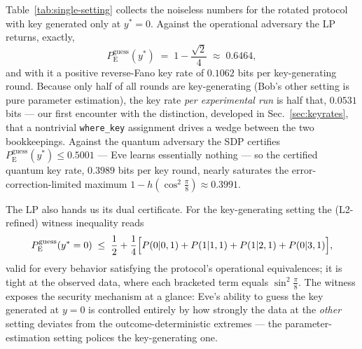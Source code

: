 \documentclass[aps,pra,twocolumn,superscriptaddress,longbibliography,nofootinbib]{revtex4-2}
\newcommand{\Eve}{\mathrm{E}}
\newcommand{\pguess}{P_{\Eve}^{\mathrm{guess}}}
\newcommand{\wherekey}{\texttt{where\_key}}
\begin{document}
Table~\ref{tab:single-setting} collects the noiseless numbers for the
rotated protocol with key generated only at $y^{\ast}=0$. Against the
operational adversary the LP returns, exactly,
\begin{equation}
  \pguess(y^{\ast}) \;=\; 1-\frac{\sqrt{2}}{4}\;\approx\;0.6464,
\end{equation}
and with it a positive reverse-Fano key rate of $0.1062$ bits per
key-generating round. Because only half of all rounds are
key-generating (Bob's other setting is pure parameter estimation), the
key rate \emph{per experimental run} is half that, $0.0531$ bits --- our
first encounter with the distinction, developed in
Sec.~\ref{sec:keyrates}, that a nontrivial \wherekey{} assignment drives
a wedge between the two bookkeepings. Against the quantum adversary the
SDP certifies $\pguess(y^{\ast})\le 0.5001$ --- Eve learns essentially
nothing --- so the certified quantum key rate, $0.3989$ bits per key
round, nearly saturates the error-correction-limited maximum
$1-h(\cos^{2}\tfrac{\pi}{8})\approx 0.3991$.

The LP also hands us its dual certificate. For the key-generating
setting the (L2-refined) witness inequality reads
\begin{equation}
\label{eq:single-setting-witness}
  \pguess(y^{\ast}=0)\;\le\;\frac12
  +\frac14\Bigl[P(0|0,1)+P(1|1,1)+P(1|2,1)+P(0|3,1)\Bigr],
\end{equation}
valid for every behavior satisfying the protocol's operational
equivalences; it is tight at the observed data, where each bracketed
term equals $\sin^{2}\tfrac{\pi}{8}$. The witness exposes the security
mechanism at a glance: Eve's ability to guess the key generated at
$y=0$ is controlled entirely by how strongly the data at the
\emph{other} setting deviates from the outcome-deterministic extremes
--- the parameter-estimation setting polices the key-generating one.
\end{document}
